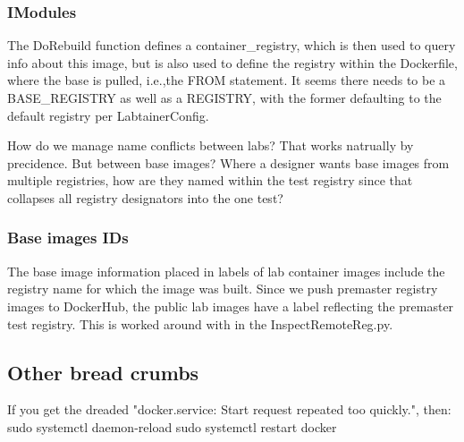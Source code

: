 \documentclass[12pt]{article}
\begin{document}
\subsubsection {IModules}
The DoRebuild function defines a container\_registry, which is then used to query info about this image, but is also used to define the
registry within the Dockerfile, where the base is pulled, i.e.,the FROM statement.  It seems there needs to be a BASE\_REGISTRY as well as
a REGISTRY, with the former defaulting to the default registry per LabtainerConfig.

How do we manage name conflicts between labs?  That works natrually by precidence.  But between base images?  Where a designer wants base
images from multiple registries, how are they named within the test registry since that collapses all registry designators into the one test?

\subsubsection {Base images IDs}
The base image information placed in labels of lab container images include the registry name for which the image was built.  Since we push
premaster registry images to DockerHub, the public lab images have a label reflecting the premaster test registry.
This is worked around with in the InspectRemoteReg.py.  

\subsection{Other bread crumbs}
If you get the dreaded "docker.service: Start request repeated too quickly.", then:
sudo systemctl daemon-reload
sudo systemctl restart docker
\end{document}
